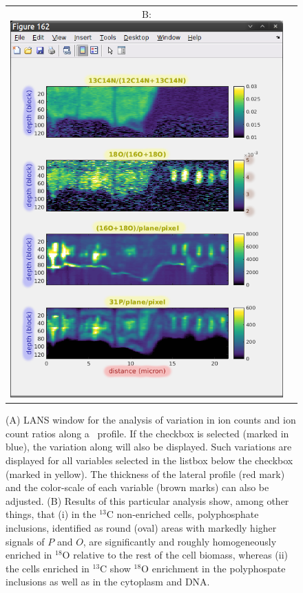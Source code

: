 \begin{figure}[!ht]
\begin{tabular}{cc}
B: \includegraphics[scale=0.3, valign=t]{figs3/LANS-lateral2}
\end{tabular}
\caption{\label{fig:lateral}%
(A) LANS window for the analysis of variation in ion counts and ion count ratios along a~ profile. If the  checkbox is selected (marked in blue), the variation along  will also be displayed. Such variations are displayed for all variables selected in the listbox below the checkbox (marked in yellow). The thickness of the lateral profile (red mark) and the color-scale of each variable (brown marks) can also be adjusted. (B) Results of this particular analysis show, among other things, that (i) in the ${}^{13}\mathrm{C}$ non-enriched cells, polyphosphate inclusions, identified as round (oval) areas with markedly higher signals of $P$ and $O$, are significantly and roughly homogeneously enriched in ${}^{18}\mathrm{O}$ relative to the rest of the cell biomass, whereas (ii) the cells enriched in ${}^{13}\mathrm{C}$ show ${}^{18}\mathrm{O}$ enrichment in the polyphospate inclusions as well as in the cytoplasm and DNA.}
\end{figure}

